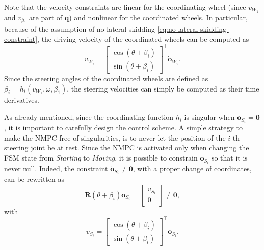 Note that the velocity constraints are linear for the coordinating wheel
(since $v_{W_1}$ and $v_{\beta_1}$ are part of $\bm{q}$) and nonlinear for the
coordinated wheels. In particular, because of the assumption of no lateral
skidding \eqref{eq:no-lateral-skidding-constraint}, the driving velocity of
the coordinated wheels can be computed as
\begin{equation*}
    v_{W_i} = 
    \begin{bmatrix}
        \cos(\theta + \beta_i) \\
        \sin(\theta + \beta_i)
    \end{bmatrix}^\top \dot{\bm{o}}_{W_i}.
\end{equation*}
Since the steering angles of the coordinated wheels are defined as
$\beta_i=h_i(v_{W_1}, \omega, \beta_1)$, the steering velocities can simply be
computed as their time derivatives.

As already mentioned, since the coordinating function $h_i$ is singular when
$\dot{\bm{o}}_{S_i}=\bm{0}$, it is important to carefully design the control
scheme. A simple strategy to make the NMPC free of singularities, is to never
let the position of the $i$-th steering joint be at rest. Since the NMPC is
activated only when changing the FSM state from \textit{Starting} to
\textit{Moving}, it is possible to constrain $\dot{\bm{o}}_{S_i}$ so that it
is never null. Indeed, the constraint $\dot{\bm{o}}_{S_i} \ne \bm{0}$, with a
proper change of coordinates, can be rewritten as
\begin{equation*}
    \bm{R}(\theta + \beta_i) \dot{\bm{o}}_{S_i} =
    \begin{bmatrix}
        v_{S_i} \\ 0
    \end{bmatrix} \ne \bm{0},
\end{equation*}
with
\begin{equation*}
    v_{S_i} = 
    \begin{bmatrix}
        \cos(\theta + \beta_i) \\
        \sin(\theta + \beta_i)
    \end{bmatrix}^\top \dot{\bm{o}}_{S_i}.
\end{equation*}


